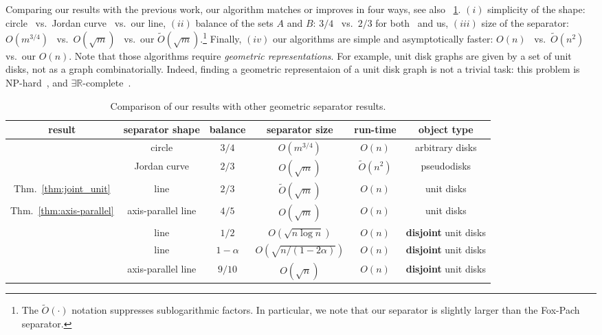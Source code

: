 \documentclass{llncs}
\begin{document}
Comparing our results with the previous work, our algorithm matches or improves in four ways, see also \tablename~\ref{tab:results-comp}. $(i)$ simplicity of the shape: circle~\cite{DBLP:journals/jacm/MillerTTV97,DBLP:conf/focs/SmithW98} vs.\ Jordan curve~\cite{Fox20081070} vs.\ our line, $(ii)$ balance of the sets $A$ and $B$: $3/4$~\cite{DBLP:journals/jacm/MillerTTV97,DBLP:conf/focs/SmithW98} vs.\ $2/3$ for both~\cite{Fox20081070} and us, $(iii)$ size of the separator: $O(m^{3/4})$~\cite{DBLP:journals/jacm/MillerTTV97,DBLP:conf/focs/SmithW98} vs.\ $O(\sqrt{m})$~\cite{Fox20081070} vs.\ our $\tilde{O}(\sqrt{m})$.\footnote{The $\tilde{O}(\cdot)$ notation suppresses sublogarithmic factors. In particular, we note that our separator is slightly larger than the Fox-Pach separator.} Finally, $(iv)$ our algorithms are simple and asymptotically faster: $O(n)$~\cite{DBLP:journals/jacm/MillerTTV97,DBLP:conf/focs/SmithW98} vs.\ $\tilde{O}(n^2)$~\cite{Fox20081070} vs.\ our $O(n)$. 
Note that those algorithms require \emph{geometric representations}.
For example, unit disk graphs are given by a set of unit disks, not as a graph
combinatorially.
Indeed, finding a geometric representaion of a unit disk graph is not a
trivial task:
this problem is NP-hard~\cite{DBLP:journals/comgeo/BreuK98}, 
and $\exists$$\mathbb{R}$-complete~\cite{DBLP:journals/dcg/KangM12}.


\begin{table}[t]
\centering
\caption{Comparison of our results with other geometric separator results.}
\begin{tabular}{c | c | c | c | c |c }
\textbf{result} & \textbf{separator shape} & \textbf{balance} & \textbf{separator size} & \textbf{run-time} & \textbf{object type}\\
\hline 
\cite{DBLP:journals/jacm/MillerTTV97,DBLP:conf/focs/SmithW98} & circle & $3/4$ & $O(m^{3/4})$ & $O(n)$ & arbitrary disks\\
\cite{Fox20081070} & Jordan curve & $2/3$ & $O(\sqrt{m})$ & $\tilde{O}(n^2)$ & pseudodisks\\
Thm.~\ref{thm:joint_unit} & line & $2/3$ & $\tilde{O}(\sqrt{m})$ & $O(n)$& unit disks\\
Thm.~\ref{thm:axis-parallel} & axis-parallel line & $4/5$ & $O(\sqrt{m})$ & $O(n)$ & unit disks\\ \hline
\cite{DBLP:journals/dcg/AlonKP89,DBLP:journals/jocg/LofflerM14,DBLP:conf/esa/HoffmannKM14} & line& $1/2$& $O(\sqrt{n\log n})$& $O(n)$& {\bf disjoint} unit disks\\
\cite{DBLP:conf/esa/HoffmannKM14} & line & $1-\alpha$& $O(\sqrt{n/(1-2\alpha)})$&$O(n)$& {\bf disjoint} unit disks  \\
\cite{DBLP:journals/jocg/LofflerM14} & axis-parallel line & $9/10$ & $O(\sqrt{n})$ & $O(n)$& {\bf disjoint} unit disks \\
\end{tabular}
\label{tab:results-comp}
\end{table}
\end{document}
